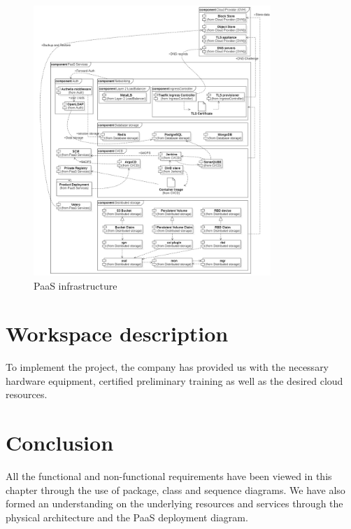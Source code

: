 \begin{figure}[!ht]\centering
\includegraphics[width=0.8\textwidth,angle=00]{assets/f8.jpg}
\caption{PaaS infrastructure}
\label{fig:f8}
\end{figure}

\section{Workspace description}

To implement the project, the company has provided us with the necessary hardware equipment, certified preliminary training as well as the desired cloud resources.

\section*{Conclusion}
All the functional and non-functional requirements have been viewed in this chapter through the use of package, class and sequence diagrams. We have also formed an understanding on the underlying resources and services through the physical architecture and the PaaS deployment diagram.





